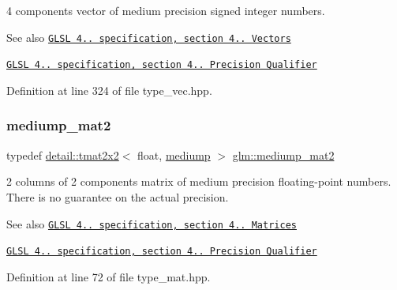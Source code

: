 4 components vector of medium precision signed integer numbers.

\begin{DoxySeeAlso}{See also}
\href{http://www.opengl.org/registry/doc/GLSLangSpec.4.20.8.pdf}{\tt G\+L\+SL 4.. specification, section 4.. Vectors} 

\href{http://www.opengl.org/registry/doc/GLSLangSpec.4.20.8.pdf}{\tt G\+L\+SL 4.. specification, section 4.. Precision Qualifier} 
\end{DoxySeeAlso}


Definition at line 324 of file type\+\_\+vec.\+hpp.

\mbox{\label{group__core__precision_ga6ed8bfa67b72cea216cb558411f95f86}} 
\subsubsection{\texorpdfstring{mediump\+\_\+mat2}{mediump\_mat2}}
{\footnotesize\ttfamily typedef \hyperlink{structglm_1_1detail_1_1tmat2x2}{detail\+::tmat2x2}$<$ float, \hyperlink{namespaceglm_a0f04f086094c747d227af4425893f545a6416f3ea0c9025fb21ed50c4d6620482}{mediump} $>$ \hyperlink{group__core__precision_ga6ed8bfa67b72cea216cb558411f95f86}{glm\+::mediump\+\_\+mat2}}

2 columns of 2 components matrix of medium precision floating-\/point numbers. There is no guarantee on the actual precision.

\begin{DoxySeeAlso}{See also}
\href{http://www.opengl.org/registry/doc/GLSLangSpec.4.20.8.pdf}{\tt G\+L\+SL 4.. specification, section 4.. Matrices} 

\href{http://www.opengl.org/registry/doc/GLSLangSpec.4.20.8.pdf}{\tt G\+L\+SL 4.. specification, section 4.. Precision Qualifier} 
\end{DoxySeeAlso}


Definition at line 72 of file type\+\_\+mat.\+hpp.

\mbox{\label{group__core__precision_ga867b486aea2d228a1e1a134af73b2c4b}} 
